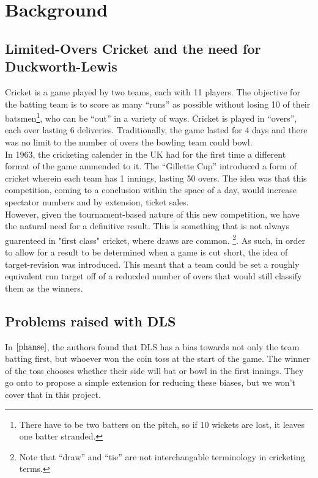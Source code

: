 \chapter{Background}

\section{Limited-Overs Cricket and the need for Duckworth-Lewis}
Cricket is a game played by two teams, each with 11 players. The objective for the batting team is to score as many ``runs'' as possible
without losing 10 of their batsmen\footnote{There have to be two batters on the pitch, so if 10 wickets are lost, it leaves one batter stranded.}, 
who can be ``out'' in a variety of ways. Cricket is played in ``overs'', each over lasting 6 deliveries. Traditionally, the game lasted for 4 days
and there was no limit to the number of overs the bowling team could bowl. \\

In 1963, the cricketing calender in the UK had for the first time a different format of the game ammended to it.
The ``Gillette Cup'' introduced a form of cricket wherein each team has 1 innings, lasting 50 overs. The idea was 
that this competition, coming to a conclusion within the space of a day, would increase spectator numbers and by extension,
ticket sales.\\

However, given the tournament-based nature of this new competition, we have the natural need for a definitive result.
This is something that is not always guarenteed in "first class" cricket, where draws are common. \footnote{Note that 
``draw'' and ``tie'' are not interchangable terminology in cricketing terms.}. As such, in order to allow for a result to be
determined when a game is cut short, the idea of target-revision was introduced. This meant that a team could be set a
roughly equivalent run target off of a reducded number of overs that would still classify them as the winners.

\section{Problems raised with DLS}
In $\cite{phanse}$, the authors found that DLS has a bias towards not only the team batting first, but whoever won the coin toss at the start of the game.
The winner of the toss chooses whether their side will bat or bowl in the first innings. They go onto to propose a simple extension for reducing
these biases, but we won't cover that in this project. 


